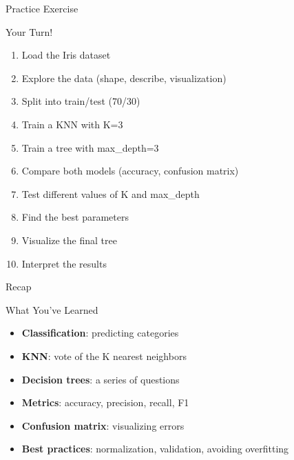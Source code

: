 \documentclass[aspectratio=169]{beamer}
\begin{document}
\begin{frame}[fragile]{Practice Exercise}
\begin{block}{Your Turn!}
\begin{enumerate}
    \item Load the Iris dataset
    \item Explore the data (shape, describe, visualization)
    \item Split into train/test (70/30)
    \item Train a KNN with K=3
    \item Train a tree with max\_depth=3
    \item Compare both models (accuracy, confusion matrix)
    \item Test different values of K and max\_depth
    \item Find the best parameters
    \item Visualize the final tree
    \item Interpret the results
\end{enumerate}
\end{block}
\end{frame}

\begin{frame}{Recap}
\begin{block}{What You've Learned}
\begin{itemize}
    \item \textbf{Classification}: predicting categories
    \item \textbf{KNN}: vote of the K nearest neighbors
    \item \textbf{Decision trees}: a series of questions
    \item \textbf{Metrics}: accuracy, precision, recall, F1
    \item \textbf{Confusion matrix}: visualizing errors
    \item \textbf{Best practices}: normalization, validation, avoiding overfitting
\end{itemize}
\end{block}


\end{frame}
\end{document}
